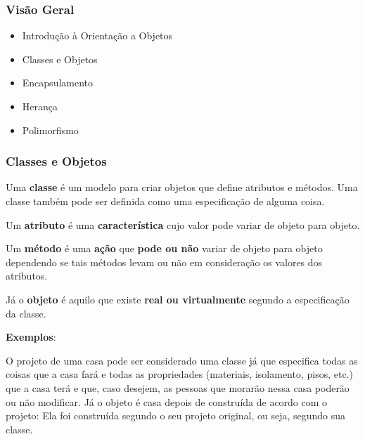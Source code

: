 \begin{frame}
	\frametitle{Visão Geral}
	\begin{itemize}
		\item Introdução à Orientação a Objetos
		\item Classes e Objetos
		\item Encapsulamento
		\item Herança
		\item Polimorfismo
	\end{itemize}
\end{frame}

\begin{frame}[allowframebreaks]
	\frametitle{Classes e Objetos}
	
	\par Uma \textbf{classe} é um modelo para criar objetos que define atributos e métodos. Uma classe também pode ser definida como uma especificação de alguma coisa.
	
	\par Um \textbf{atributo} é uma \textbf{característica} cujo valor pode variar de objeto para objeto.
	
	\par Um \textbf{método} é uma \textbf{ação} que \textbf{pode ou não} variar de objeto para objeto dependendo se tais métodos levam ou não em consideração os valores dos atributos.
	
	\par Já o \textbf{objeto} é aquilo que existe \textbf{real ou virtualmente} segundo a especificação da classe.

	\par \textbf{Exemplos}:
	\par O projeto de uma casa pode ser considerado uma classe já que especifica todas as coisas que a casa fará e todas as propriedades (materiais, isolamento, pisos, etc.) que a casa terá e que, caso desejem, as pessoas que morarão nessa casa poderão ou não modificar. Já o objeto é casa depois de construída de acordo com o projeto: Ela foi construída segundo o seu projeto original, ou seja, segundo sua classe.
\end{frame}

